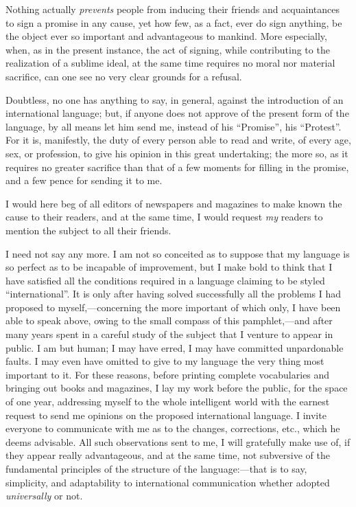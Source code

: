 Nothing actually \emph{prevents} people from inducing their friends and acquaintances to sign a promise in any cause, yet how few, as a fact, ever do sign anything, be the object ever so important and advantageous to mankind. More especially, when, as in the present instance, the act of signing, while contributing to the realization of a sublime ideal, at the same time requires no moral nor material sacrifice, can one see no very clear grounds for a refusal.

Doubtless, no one has anything to say, in general, against the introduction of an international language; but, if anyone does not approve of the present form of the language, by all means let him send me, instead of his “Promise”, his “Protest”. For it is, manifestly, the duty of every person able to read and write, of every age, sex, or profession, to give his opinion in this great undertaking; the more so, as it requires no greater sacrifice than that of a few moments for filling in the promise, and a few pence for sending it to me.

I would here beg of all editors of newspapers and magazines to make known the cause to their readers, and at the same time, I would request \emph{my} readers to mention the subject to all their friends.

I need not say any more. I am not so conceited as to suppose that my language is so perfect as to be incapable of improvement, but I make bold to think that I have satisfied all the conditions required in a language claiming to be styled “international”. It is only after having solved successfully all the problems I had proposed to myself,---concerning the more important of which only, I have been able to speak above, owing to the small compass of this pamphlet,---and after many years spent in a careful study of the subject that I venture to appear in public. I am but human; I may have erred, I may have committed unpardonable faults. I may even have omitted to give to my language the very thing most important to it. For these reasons, before printing complete vocabularies and bringing out books and magazines, I lay my work before the public, for the space of one year, addressing myself to the whole intelligent world with the earnest request to send me opinions on the proposed international language. I invite everyone to communicate with me as to the changes, corrections, etc., which he deems advisable. All such observations sent to me, I will gratefully make use of, if they appear really advantageous, and at the same time, not subversive of the fundamental principles of the structure of the language:---that is to say, simplicity, and adaptability to international communication whether adopted \emph{universally} or not.

